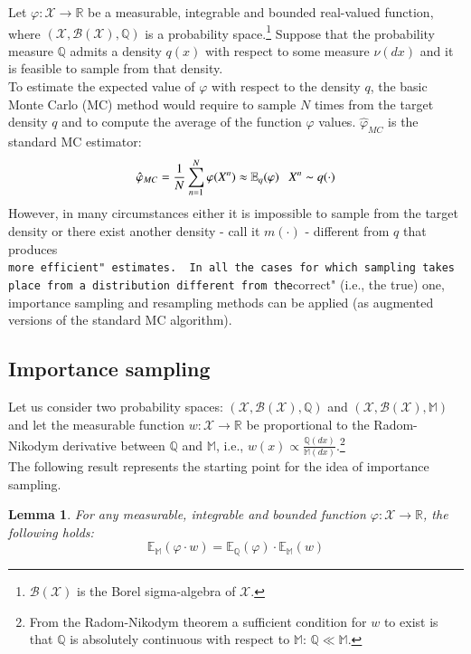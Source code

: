\documentclass[
]{book}
\theoremstyle{break}
\newtheorem{lemma}{Lemma}
\theoremstyle{nonumberplain}
\begin{document}
Let \(\varphi: \mathcal X\rightarrow \mathbb R\) be a measurable,
integrable and bounded real-valued function, where
\((\mathcal X,\mathcal B(\mathcal X),\mathbb Q)\) is a probability
space.\footnote{$\mathcal B(\mathcal X)$ is the Borel sigma-algebra of $\mathcal X$.}
Suppose that the probability measure \(\mathbb Q\) admits a density
\(q(x)\) with respect to some measure \(\nu(dx)\) and it is feasible to
sample from that density.\\
To estimate the expected value of \(\varphi\) with respect to the
density \(q\), the basic Monte Carlo (MC) method would require to sample
\(N\) times from the target density \(q\) and to compute the average of
the function \(\varphi\) values. \(\hat \varphi_{MC}\) is the standard
MC estimator: \begin{equation*}
   \hat \varphi_{MC}=\frac{1}{N} \sum_{n=1}^N\varphi (X^n)\approx \mathbb E_q(\varphi)~~~X^n\thicksim q(\cdot)
\end{equation*} However, in many circumstances either it is impossible
to sample from the target density or there exist another density - call
it \(m(\cdot)\) - different from \(q\) that produces
\texttt{more\ efficient"\ estimates.\ \ In\ all\ the\ cases\ for\ which\ sampling\ takes\ place\ from\ a\ distribution\ different\ from\ the}correct"
(i.e., the true) one, importance sampling and resampling methods can be
applied (as augmented versions of the standard MC algorithm).

\subsection{Importance sampling}

Let us consider two probability spaces:
\((\mathcal X,\mathcal B(\mathcal X),\mathbb Q)\) and
\((\mathcal X,\mathcal B(\mathcal X),\mathbb M)\) and let the measurable
function \(w:\mathcal X\rightarrow \mathbb R\) be proportional to the
Radom-Nikodym derivative between \(\mathbb Q\) and \(\mathbb M\), i.e.,
\(w(x)\propto\frac{\mathbb Q(dx)}{\mathbb M(dx)}\).\footnote{From the Radom-Nikodym theorem a sufficient condition for $w$ to exist is that $\mathbb Q$ is absolutely continuous with respect to $\mathbb M$: $\mathbb Q\ll \mathbb M$.}\\
The following result represents the starting point for the idea of
importance sampling.

\begin{lemma}\label{lemma_imp_sam_1}
For any measurable, integrable and bounded function $\varphi: \mathcal X\rightarrow \mathbb R$, the following holds:
\begin{equation}
    \mathbb E_\mathbb M(\varphi \cdot w)=\mathbb E_\mathbb Q(\varphi)\cdot \mathbb E_\mathbb M(w)
\end{equation}
\end{lemma}
\end{document}
